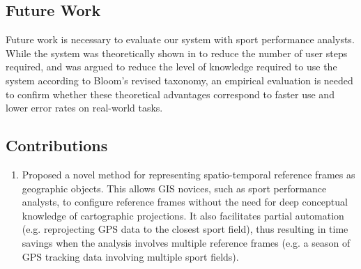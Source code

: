\subsection*{Future Work}

Future work is necessary to evaluate our system with sport performance analysts. While the system was theoretically shown in  to reduce the number of user steps required, and was argued to reduce the level of knowledge required to use the system according to Bloom's revised taxonomy, an empirical evaluation is needed to confirm whether these theoretical advantages correspond to faster use and lower error rates on real-world tasks.

\subsection*{Contributions}

\begin{enumerate}
  \item Proposed a novel method for representing spatio-temporal reference frames as geographic objects. This allows GIS novices, such as sport performance analysts, to configure reference frames without the need for deep conceptual knowledge of cartographic projections. It also facilitates partial automation (e.g. reprojecting GPS data to the closest sport field), thus resulting in time savings when the analysis involves multiple reference frames (e.g. a season of GPS tracking data involving multiple sport fields).
\end{enumerate}
